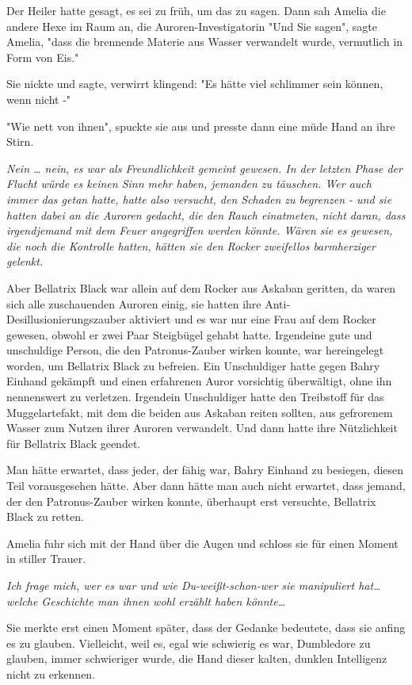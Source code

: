 {Der Heiler hatte gesagt, es sei zu früh, um das zu sagen. Dann sah Amelia die andere Hexe im Raum an, die Auroren-Investigatorin "Und Sie sagen", sagte Amelia, "dass die brennende Materie aus Wasser verwandelt wurde, vermutlich in Form von Eis."

Sie nickte und sagte, verwirrt klingend: "Es hätte viel schlimmer sein können, wenn nicht -"

"Wie nett von ihnen", spuckte sie aus und presste dann eine müde Hand an ihre Stirn.

\emph{Nein … nein, es war als Freundlichkeit gemeint gewesen. In der letzten Phase der Flucht würde es keinen Sinn mehr haben, jemanden zu täuschen. Wer auch immer das getan hatte, hatte also versucht, den Schaden zu begrenzen - und sie hatten dabei an die Auroren gedacht, die den Rauch einatmeten, nicht daran, dass irgendjemand mit dem Feuer angegriffen werden könnte. Wären sie es gewesen, die noch die Kontrolle hatten, hätten sie den Rocker zweifellos barmherziger gelenkt.}

Aber Bellatrix Black war allein auf dem Rocker aus Askaban geritten, da waren sich alle zuschauenden Auroren einig, sie hatten ihre Anti-Desillusionierungszauber aktiviert und es war nur eine Frau auf dem Rocker gewesen, obwohl er zwei Paar Steigbügel gehabt hatte. Irgendeine gute und unschuldige Person, die den Patronus-Zauber wirken konnte, war hereingelegt worden, um Bellatrix Black zu befreien. Ein Unschuldiger hatte gegen Bahry Einhand gekämpft und einen erfahrenen Auror vorsichtig überwältigt, ohne ihn nennenswert zu verletzen. Irgendein Unschuldiger hatte den Treibstoff für das Muggelartefakt, mit dem die beiden aus Askaban reiten sollten, aus gefrorenem Wasser zum Nutzen ihrer Auroren verwandelt. Und dann hatte ihre Nützlichkeit für Bellatrix Black geendet.

Man hätte erwartet, dass jeder, der fähig war, Bahry Einhand zu besiegen, diesen Teil vorausgesehen hätte. Aber dann hätte man auch nicht erwartet, dass jemand, der den Patronus-Zauber wirken konnte, überhaupt erst versuchte, Bellatrix Black zu retten.

Amelia fuhr sich mit der Hand über die Augen und schloss sie für einen Moment in stiller Trauer.

\emph{Ich frage mich, wer es war und wie Du-weißt-schon-wer sie manipuliert hat… welche Geschichte man ihnen wohl erzählt haben könnte…}

Sie merkte erst einen Moment später, dass der Gedanke bedeutete, dass sie anfing es zu glauben. Vielleicht, weil es, egal wie schwierig es war, Dumbledore zu glauben, immer schwieriger wurde, die Hand dieser kalten, dunklen Intelligenz nicht zu erkennen.

}
